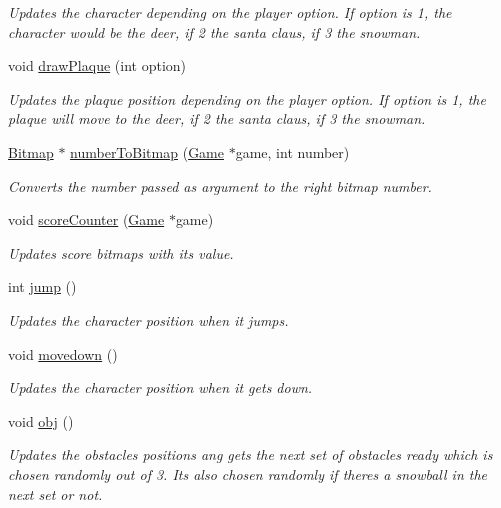 \begin{DoxyCompactItemize}
\begin{DoxyCompactList}\small\item\em Updates the character depending on the player option. If option is 1, the character would be the deer, if 2 the santa claus, if 3 the snowman. \end{DoxyCompactList}\item 
void \hyperlink{group___graphics_gad185badd1bb6af7027ee2fba1539c055}{draw\+Plaque} (int option)
\begin{DoxyCompactList}\small\item\em Updates the plaque position depending on the player option. If option is 1, the plaque will move to the deer, if 2 the santa claus, if 3 the snowman. \end{DoxyCompactList}\item 
\hyperlink{struct_bitmap}{Bitmap} $\ast$ \hyperlink{group___graphics_ga2480f417fa8ca1b9b31cf7677dff4541}{number\+To\+Bitmap} (\hyperlink{struct_game}{Game} $\ast$game, int number)
\begin{DoxyCompactList}\small\item\em Converts the number passed as argument to the right bitmap number. \end{DoxyCompactList}\item 
void \hyperlink{group___graphics_ga60fea1793f63faa9ab7db42296e3d8a7}{score\+Counter} (\hyperlink{struct_game}{Game} $\ast$game)
\begin{DoxyCompactList}\small\item\em Updates score bitmaps with its value. \end{DoxyCompactList}\item 
int \hyperlink{group___graphics_ga307c4ac67d1d0316a5e01620930504c5}{jump} ()
\begin{DoxyCompactList}\small\item\em Updates the character position when it jumps. \end{DoxyCompactList}\item 
void \hyperlink{group___graphics_ga84ffc930c9e1c8c6de9173eadd3c975d}{movedown} ()
\begin{DoxyCompactList}\small\item\em Updates the character position when it gets down. \end{DoxyCompactList}\item 
void \hyperlink{group___graphics_gab2dd31b45cae53400c50cc728db456ca}{obj} ()
\begin{DoxyCompactList}\small\item\em Updates the obstacles positions ang gets the next set of obstacles ready which is chosen randomly out of 3. It\textquotesingle{}s also chosen randomly if there\textquotesingle{}s a snowball in the next set or not. \end{DoxyCompactList}\item 

\end{DoxyCompactItemize}
